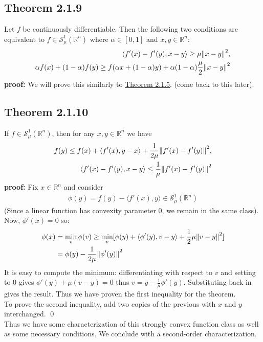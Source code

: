 \documentclass[12pt,a4paper]{article}
\begin{document}
	 \subsection*{Theorem 2.1.9}\label{thm219}
	 Let $f$ be continuously differentiable. Then the following two conditions are equivalent to $f \in \mathcal{S}_{\mu}^{1}(\mathbb{R}^n)$ where $\alpha \in [0,1]$ and $x,y \in \mathbb{R}^n$:
	 \begin{align}
	 	\langle f'(x) - f'(y), x - y \rangle \geq \mu \norm{x - y}^2 ,\\
	 	\alpha f(x) + (1 - \alpha)f(y) \geq f(\alpha x + (1 - \alpha)y) + \alpha (1 - \alpha)\frac{\mu}{2}\norm{x - y}^2
	 \end{align}
	 \textbf{proof:} We will prove this similarly to \hyperref[thm215]{Theorem 2.1.5}.  (come back to this later). 
	 \subsection*{Theorem 2.1.10}\label{thm2110}
	 If $f \in \mathcal{S}_{\mu}^{1}(\mathbb{R}^n)$, then for any $x,y \in \mathbb{R}^n$ we have
	 \begin{align}
	 	f(y) \leq f(x) + \langle f'(x), y - x \rangle + \frac{1}{2\mu}\norm{f'(x) - f'(y)}^2, \\
	 	\langle f'(x) - f'(y), x - y \rangle \leq \frac{1}{\mu}\norm{f'(x) - f'(y)}^2
	 \end{align}
	 \textbf{proof:} Fix $x \in \mathbb{R}^n$ and consider
	 \begin{align*}
	 	\phi(y) = f(y) - \langle f'(x), y \rangle \in \mathcal{S}_{\mu}^{1}(\mathbb{R}^n)
	 \end{align*}
	 (Since a linear function has convexity parameter 0, we remain in the same class).\\
	 Now, $\phi'(x) = 0$ so:
	 \begin{align*}
	 	\phi(x) &= \min_{v}\phi(v) \geq \min_{v}[\phi(y) + \langle \phi'(y), v - y \rangle + \frac{1}{2}\mu\norm{v-y}^2] \\
	 	&= \phi(y) - \frac{1}{2\mu}\norm{\phi'(y)}^2
	 \end{align*} 
	 It is easy to compute the minimum: differentiating with respect to $v$ and setting to $0$ gives $\phi'(y) + \mu (v-y) = 0$ thus $v = y - \frac{1}{\mu}\phi'(y)$. Substituting back in gives the result. Thus we have proven the first inequality for the theorem.\\
	 To prove the second inequality, add two copies of the previous with $x$ and $y$ interchanged. \qed \\
	 Thus we have some characterization of this strongly convex function class as well as some necessary conditions. We conclude with a second-order characterization.
\end{document}
